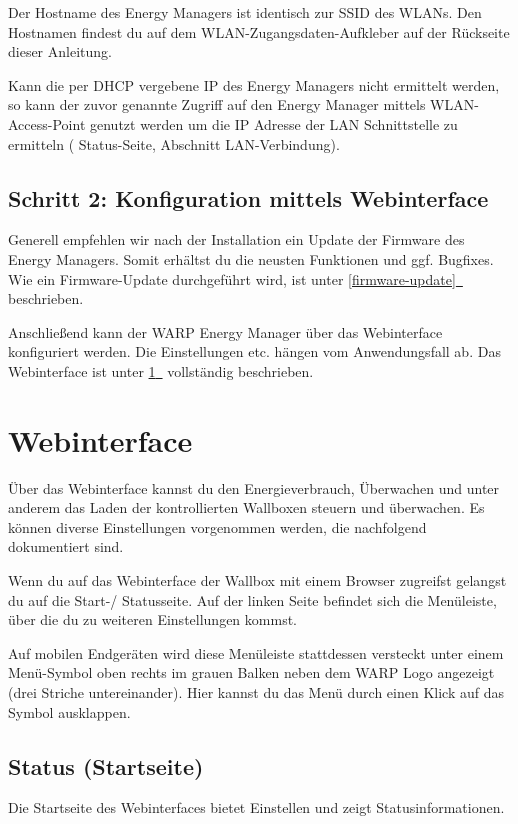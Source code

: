 \documentclass[a4paper,10pt]{article}
\newcommand*{\fullref}[1]{\hyperref[{#1}]{\ref*{#1}~\nameref*{#1}}}
\begin{document}
\begin{multicols*}{2}
	Der Hostname des Energy Managers ist identisch zur SSID des WLANs. Den Hostnamen findest du
	auf dem WLAN-Zugangsdaten-Aufkleber auf der Rückseite dieser Anleitung.

	Kann die per DHCP vergebene IP des Energy Managers nicht ermittelt werden, so kann der
	zuvor genannte Zugriff auf den Energy Manager mittels WLAN-Access-Point genutzt
	werden um die IP Adresse der LAN Schnittstelle zu ermitteln (\glqq
	Status-Seite\grqq, Abschnitt \glqq LAN-Verbindung\grqq).


	\subsection{Schritt 2: Konfiguration mittels Webinterface}
	Generell empfehlen wir nach der Installation ein Update der Firmware des
	Energy Managers. Somit erhältst du die neusten Funktionen und ggf. Bugfixes. Wie ein
	Firmware-Update durchgeführt wird, ist unter \fullref{firmware-update}
	beschrieben.

	Anschließend kann der WARP Energy Manager über das Webinterface konfiguriert
	werden. Die Einstellungen etc. hängen vom Anwendungsfall ab. 
	Das Webinterface ist unter \fullref{webinterface} vollständig beschrieben.

	\newpage
	\section{Webinterface}
	\label{webinterface}

	Über das Webinterface kannst du den Energieverbrauch, Überwachen und 
	unter anderem das Laden der kontrollierten Wallboxen steuern und überwachen.
	Es können diverse Einstellungen vorgenommen werden, die nachfolgend
	dokumentiert sind.

	Wenn du auf das Webinterface der Wallbox mit einem Browser zugreifst
	gelangst du auf die Start-/ Statusseite. Auf der linken Seite befindet sich
	die Menüleiste, über die du zu weiteren Einstellungen kommst.

	Auf mobilen Endgeräten wird
	diese Menüleiste stattdessen versteckt unter einem Menü-Symbol oben rechts
	im grauen Balken neben dem WARP Logo angezeigt (\glqq drei Striche untereinander\grqq).
	Hier kannst du das Menü durch einen Klick auf das Symbol ausklappen.

	\vspace{-0.2cm}
	\subsection{Status (Startseite)}
	\label{status}
	Die Startseite des Webinterfaces bietet Einstellen und zeigt Statusinformationen.


\end{multicols*}
\end{document}

